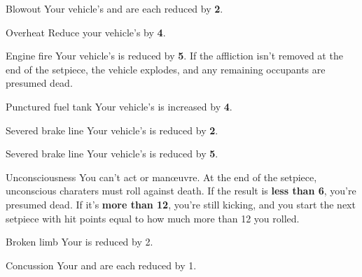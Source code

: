 
\begin{describe}{Blowout}
  Your vehicle's  and  are each reduced by \textbf{2}.
\end{describe}

\begin{describe}{Overheat}
  Reduce your vehicle's  by \textbf{4}.
\end{describe}

\begin{describe}{Engine fire}
  Your vehicle's  is reduced by \textbf{5}. If the affliction isn't removed at the end of the setpiece, the vehicle explodes, and any remaining occupants are presumed dead.
\end{describe}

\begin{describe}{Punctured fuel tank}
  Your vehicle's  is increased by \textbf{4}.
\end{describe}

\begin{describe}{Severed brake line}
  Your vehicle's  is reduced by \textbf{2}.
\end{describe}

\begin{describe}{Severed brake line}
  Your vehicle's  is reduced by \textbf{5}.
\end{describe}

\hr

\begin{describe}{Unconsciousness}
  You can't act or man\oe{}uvre. At the end of the setpiece, unconscious charaters must roll  against death. If the result is \textbf{less than 6}, you're presumed dead. If it's \textbf{more than 12}, you're still kicking, and you start the next setpiece with hit points equal to how much more than 12 you rolled.
\end{describe}

\begin{describe}{Broken limb}
  Your  is reduced by 2.
\end{describe}

\begin{describe}{Concussion}
  Your  and  are each reduced by 1.
\end{describe}
